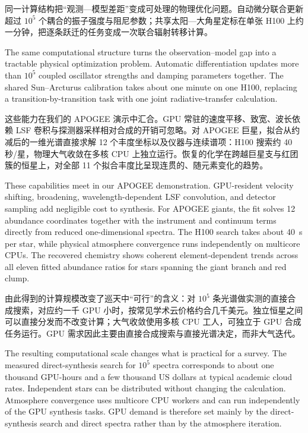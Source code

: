 同一计算结构把“观测—模型差距”变成可处理的物理优化问题。自动微分联合更新超过 $10^5$ 个耦合的振子强度与阻尼参数；共享太阳—大角星定标在单张 H100 上约一分钟，把逐条跃迁的任务变成一次联合辐射转移计算。

\begin{EN}
The same computational structure turns the observation--model gap into a
tractable physical optimization problem. Automatic differentiation updates
more than $10^5$ coupled oscillator strengths and damping parameters together.
The shared Sun--Arcturus calibration takes about one minute on one H100,
replacing a transition-by-transition task with one joint radiative-transfer
calculation.
\end{EN}

这些能力在我们的 APOGEE 演示中汇合。GPU 常驻的速度平移、致宽、波长依赖 LSF 卷积与探测器采样相对合成的开销可忽略。对 APOGEE 巨星，拟合从约减后的一维光谱直接求解 12 个丰度坐标以及仪器与连续谱项：H100 搜索约 40 秒/星，物理大气收敛在多核 CPU 上独立运行。恢复的化学在跨越巨星支与红团簇的恒星上，对全部 11 个拟合丰度比呈现连贯的、随元素变化的趋势。

\begin{EN}
These capabilities meet in our APOGEE demonstration. GPU-resident velocity
shifting, broadening, wavelength-dependent LSF convolution, and detector
sampling add negligible cost to synthesis. For APOGEE giants, the fit solves
12 abundance coordinates together with the instrument and continuum terms
directly from reduced one-dimensional spectra. The H100 search takes about
40~s per star, while physical atmosphere convergence runs independently on
multicore CPUs. The recovered chemistry shows coherent element-dependent trends
across all eleven fitted abundance ratios for stars spanning the giant branch
and red clump.
\end{EN}

由此得到的计算规模改变了巡天中“可行”的含义：对 $10^5$ 条光谱做实测的直接合成搜索，对应约一千 GPU 小时，按常见学术云价格约合几千美元。独立恒星之间可以直接分发而不改变计算；大气收敛使用多核 CPU 工人，可独立于 GPU 合成任务运行。GPU 需求因此主要由直接合成搜索与直接光谱决定，而非大气迭代。

\begin{EN}
The resulting computational scale changes what is practical for a survey. The
measured direct-synthesis search for $10^5$ spectra corresponds to about
one thousand GPU-hours and a few thousand US dollars at typical academic cloud
rates.
Independent stars can be distributed without changing the calculation.
Atmosphere convergence uses multicore CPU workers and can run
independently of the GPU synthesis tasks. GPU demand is therefore set mainly by
the direct-synthesis search and direct spectra rather than by the atmosphere
iteration.
\end{EN}

